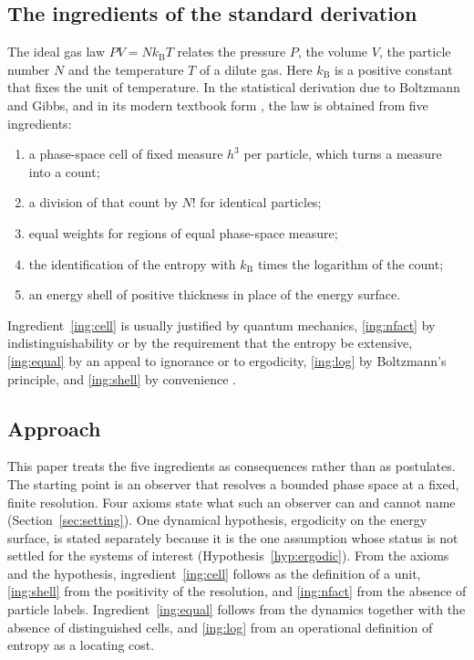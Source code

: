 \documentclass[11pt,a4paper]{article}
\theoremstyle{definition}
\theoremstyle{remark}
\newcommand{\kB}{k_{\mathrm{B}}}
\begin{document}
\subsection{The ingredients of the standard derivation}

The ideal gas law $PV=N\kB T$ relates the pressure $P$, the volume $V$, the particle number $N$ and the temperature $T$ of a dilute gas.
Here $\kB$ is a positive constant that fixes the unit of temperature.
In the statistical derivation due to Boltzmann and Gibbs, and in its modern textbook form \citep{boltzmann1877,gibbs1902,huang1987}, the law is obtained from five ingredients:
\begin{enumerate}[label=(I\arabic*),leftmargin=3em]
\item\label{ing:cell} a phase-space cell of fixed measure $h^{3}$ per particle, which turns a measure into a count;
\item\label{ing:nfact} a division of that count by $N!$ for identical particles;
\item\label{ing:equal} equal weights for regions of equal phase-space measure;
\item\label{ing:log} the identification of the entropy with $\kB$ times the logarithm of the count;
\item\label{ing:shell} an energy shell of positive thickness in place of the energy surface.
\end{enumerate}
Ingredient~\ref{ing:cell} is usually justified by quantum mechanics, \ref{ing:nfact} by indistinguishability or by the requirement that the entropy be extensive, \ref{ing:equal} by an appeal to ignorance or to ergodicity, \ref{ing:log} by Boltzmann's principle, and \ref{ing:shell} by convenience \citep{huang1987,khinchin1949,jaynes1965}.

\subsection{Approach}

This paper treats the five ingredients as consequences rather than as postulates.
The starting point is an observer that resolves a bounded phase space at a fixed, finite resolution.
Four axioms state what such an observer can and cannot name (Section~\ref{sec:setting}).
One dynamical hypothesis, ergodicity on the energy surface, is stated separately because it is the one assumption whose status is not settled for the systems of interest (Hypothesis~\ref{hyp:ergodic}).
From the axioms and the hypothesis, ingredient~\ref{ing:cell} follows as the definition of a unit, \ref{ing:shell} from the positivity of the resolution, and \ref{ing:nfact} from the absence of particle labels.
Ingredient~\ref{ing:equal} follows from the dynamics together with the absence of distinguished cells, and \ref{ing:log} from an operational definition of entropy as a locating cost.
\end{document}
